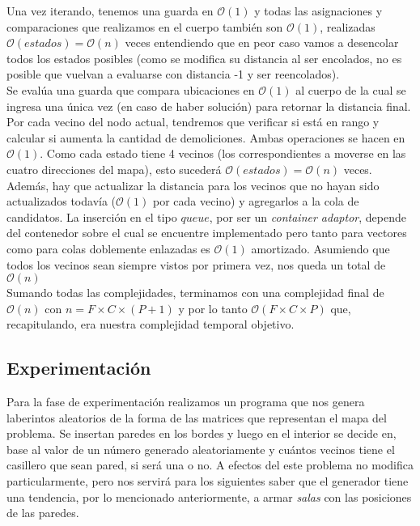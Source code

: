     Una vez iterando, tenemos una guarda en $\mathcal{O}(1)$ y todas las asignaciones y comparaciones que realizamos en el cuerpo también son $\mathcal{O}(1)$, realizadas $\mathcal{O}(estados) = \mathcal{O}(n)$ veces entendiendo que en peor caso vamos a desencolar todos los estados posibles (como se modifica su distancia al ser encolados, no es posible que vuelvan a evaluarse con distancia -1 y ser reencolados).
    \\

    Se evalúa una guarda que compara ubicaciones en $\mathcal{O}(1)$ al cuerpo de la cual se ingresa una única vez (en caso de haber solución) para retornar la distancia final.
    \\

    Por cada vecino del nodo actual, tendremos que verificar si está en rango y calcular si aumenta la cantidad de demoliciones. Ambas operaciones se hacen en $\mathcal{O}(1)$. Como cada estado tiene 4 vecinos (los correspondientes a moverse en las cuatro direcciones del mapa), esto sucederá $\mathcal{O}(estados) = \mathcal{O}(n) $ veces. Además, hay que actualizar la distancia para los vecinos que no hayan sido actualizados todavía ($\mathcal{O}(1)$ por cada vecino) y agregarlos a la cola de candidatos. La inserción en el tipo $queue$, por ser un \emph{container adaptor}, depende del contenedor sobre el cual se encuentre implementado pero tanto para vectores como para colas doblemente enlazadas es $\mathcal{O}(1)$ amortizado. Asumiendo que todos los vecinos sean siempre vistos por primera vez, nos queda un total de $\mathcal{O}(n)$
    \\

    Sumando todas las complejidades, terminamos con una complejidad final de $\mathcal{O}(n)$ con $n = F\times C\times (P+1)$ y por lo tanto $\mathcal{O}(F\times C\times P)$ que, recapitulando, era nuestra complejidad temporal objetivo.

\newpage
\subsection{Experimentación}

    Para la fase de experimentación realizamos un programa que nos genera laberintos aleatorios de la forma de las matrices que representan el mapa del problema. Se insertan paredes en los bordes y luego en el interior se decide en, base al valor de un número generado aleatoriamente y cuántos vecinos tiene el casillero que sean pared, si será una o no. A efectos del este problema no modifica particularmente, pero nos servirá para los siguientes saber que el generador tiene una tendencia, por lo mencionado anteriormente, a armar \emph{salas} con las posiciones de las paredes.

